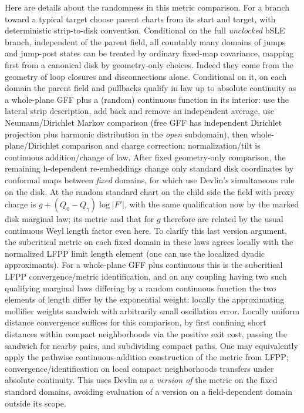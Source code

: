 Here are details about the randomness in this metric comparison.
For a branch toward a typical target choose parent charts from its start and target, with deterministic strip-to-disk convention.
Conditional on the full \emph{unclocked} bSLE branch, independent of the parent field, all countably many domains of jumps and jump-post states can be treated by ordinary fixed-map covariance, mapping first from a canonical disk by geometry-only choices.
Indeed they come from the geometry of loop closures and disconnections alone.
Conditional on it, on each domain the parent field and pullbacks qualify in law up to absolute continuity as a whole-plane GFF plus a (random) continuous function in its interior: use the lateral strip description, add back and remove an independent average, use Neumann/Dirichlet Markov comparison (free GFF has independent Dirichlet projection plus harmonic distribution in the \emph{open} subdomain), then whole-plane/Dirichlet comparison and charge correction; normalization/tilt is continuous addition/change of law.
After fixed geometry-only comparison, the remaining h-dependent re-embeddings change only standard disk coordinates by conformal maps between \emph{fixed} domains, for which use Devlin's simultaneous rule on the disk.
At the random standard chart on the child side the field with proxy charge is \(g+(Q_0-Q_\gamma)\log|F'|\), with the same qualification now by the marked disk marginal law; its metric and that for \(g\) therefore are related by the usual continuous Weyl length factor even here.
To clarify this last version argument, the subcritical metric on each fixed domain in these laws agrees locally with the normalized LFPP limit length element (one can use the localized dyadic approximants).
For a whole-plane GFF plus continuous this is the subcritical LFPP convergence/metric identification, and on any coupling having two such qualifying marginal laws differing by a random continuous function the two elements of length differ by the exponential weight: locally the approximating mollifier weights sandwich with arbitrarily small oscillation error.
Locally uniform distance convergence suffices for this comparison, by first confining short distances within compact neighborhoods via the positive exit cost, passing the sandwich for nearby pairs, and subdividing compact paths.
One may equivalently apply the pathwise continuous-addition construction of the metric from LFPP; convergence/identification on local compact neighborhoods transfers under absolute continuity.
This uses Devlin as a \emph{version of} the metric on the fixed standard domains, avoiding evaluation of a version on a field-dependent domain outside its scope.

